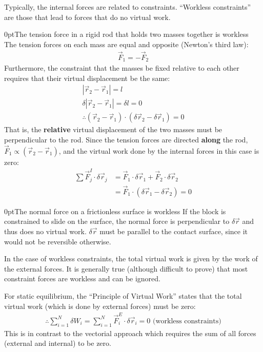 Typically, the internal forces are related to constraints. ``Workless constraints'' are those that lead to forces that do no virtual work.
\begin{example}{0pt}{The tension force in a rigid rod that holds two masses together is workless}{}
The tension forces on each mass are equal and opposite (Newton's third law):
\begin{align*}
\vec{F}_1=-\vec{F}_2
\end{align*}
Furthermore, the constraint that the masses be fixed relative to each other requires that their virtual displacement be the same:
\begin{align*}
\left|\vec{r}_2-\vec{r}_1\right|=l\nonumber\\
\delta \left|\vec{r}_2-\vec{r}_1\right|=\delta l=0\nonumber\\
\therefore (\vec{r}_2-\vec{r}_1)\cdot(\delta\vec{r}_2-\delta\vec{r}_1)=0
\end{align*}
That is, the \textbf{relative} virtual displacement of the two masses must be perpendicular to the rod. Since the tension forces are directed \textbf{along} the rod, $\vec{F}_1\propto(\vec{r}_2-\vec{r}_1)$, and the virtual work done by the internal forces in this case is zero:
\begin{align*}
\sum\vec{F}^I_j\cdot\delta\vec{r}_j&=\vec{F}_1\cdot\delta\vec{r}_1+\vec{F}_2\cdot\delta\vec{r}_2\nonumber\\
&=\vec{F}_1\cdot(\delta\vec{r}_1-\delta\vec{r}_2)=0
\end{align*}
\end{example}
\begin{example}{0pt}{The normal force on a frictionless surface is workless}{}
If the block is constrained to slide on the surface, the normal force is perpendicular to $\delta \vec{r}$ and thus does no virtual work. $\delta \vec{r}$ must be parallel to the contact surface, since it would not be reversible otherwise.
\end{example}

In the case of workless constraints, the total virtual work is given by the work of the external forces. It is generally true (although difficult to prove) that most constraint forces are workless and can be ignored.

For static equilibrium, the ``Principle of Virtual Work'' states that the total virtual work (which is done by external forces) must be zero:
\begin{align}
\therefore \sum_{i=1}^N\delta W_i=\sum_{i=1}^N \vec{F}^E_i\cdot\delta\vec{r}_i = 0 \text{   (workless constraints)}
\end{align}
This is in contrast to the vectorial approach which requires the sum of all forces (external and internal) to be zero.

